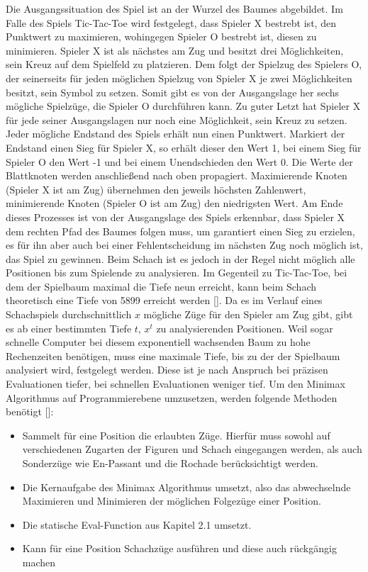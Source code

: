 Die Ausgangssituation des Spiel ist an der Wurzel des Baumes abgebildet.
Im Falle des Spiels Tic-Tac-Toe wird festgelegt, dass Spieler X bestrebt ist, den Punktwert zu maximieren, wohingegen Spieler O bestrebt ist, diesen zu minimieren.
Spieler X ist als nächstes am Zug und besitzt drei Möglichkeiten, sein Kreuz auf dem Spielfeld zu platzieren.
Dem folgt der Spielzug des Spielers O, der seinerseits für jeden möglichen Spielzug von Spieler X je zwei Möglichkeiten besitzt, sein Symbol zu setzen.
Somit gibt es von der Ausgangslage her sechs mögliche Spielzüge, die Spieler O durchführen kann.
Zu guter Letzt hat Spieler X für jede seiner Ausgangslagen nur noch eine Möglichkeit, sein Kreuz zu setzen.
Jeder mögliche Endstand des Spiels erhält nun einen Punktwert.
Markiert der Endstand einen Sieg für Spieler X, so erhält dieser den Wert 1, bei einem Sieg für Spieler O den Wert -1 und bei einem Unendschieden den Wert 0.
Die Werte der Blattknoten werden anschließend nach oben propagiert.
Maximierende Knoten (Spieler X ist am Zug) übernehmen den jeweils höchsten Zahlenwert, minimierende Knoten (Spieler O ist am Zug) den niedrigsten Wert.
Am Ende dieses Prozesses ist von der Ausgangslage des Spiels erkennbar, dass Spieler X dem rechten Pfad des Baumes folgen muss, um garantiert einen Sieg zu erzielen, es für ihn aber auch bei einer Fehlentscheidung im nächsten Zug noch möglich ist, das Spiel zu gewinnen.
Beim Schach ist es jedoch in der Regel nicht möglich alle Positionen bis zum Spielende zu analysieren.
Im Gegenteil zu Tic-Tac-Toe, bei dem der Spielbaum maximal die Tiefe neun erreicht, kann beim Schach theoretisch eine Tiefe von 5899 erreicht werden [\cite{Wikipedia2018}].
Da es im Verlauf eines Schachspiels durchschnittlich $x$ mögliche Züge für den Spieler am Zug gibt, gibt es ab einer bestimmten Tiefe $t$, $x^t$ zu analysierenden Positionen.
Weil sogar schnelle Computer bei diesem exponentiell wachsenden Baum zu hohe Rechenzeiten benötigen, muss eine maximale Tiefe, bis zu der der Spielbaum analysiert wird, festgelegt werden.
Diese ist je nach Anspruch bei präzisen Evaluationen tiefer, bei schnellen Evaluationen weniger tief.
Um den Minimax Algorithmus auf Programmierebene umzusetzen, werden folgende Methoden benötigt [\cite{Shannon1950}]:

\begin{itemize}
    \item Sammelt für eine Position die erlaubten Züge. Hierfür muss sowohl auf verschiedenen Zugarten der Figuren und Schach eingegangen werden, als auch Sonderzüge wie En-Passant und die Rochade berücksichtigt werden.
    \item Die Kernaufgabe des Minimax Algorithmus umsetzt, also das abwechselnde Maximieren und Minimieren der möglichen Folgezüge einer Position.
    \item Die statische Eval-Function aus Kapitel 2.1 umsetzt.
    \item Kann für eine Position Schachzüge ausführen und diese auch rückgängig machen
\end{itemize}

